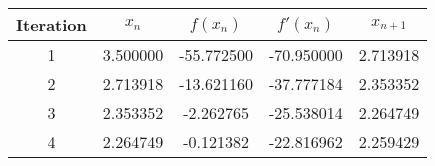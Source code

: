 \begin{tabular}{|c|c|c|c|c|}
\hline
Iteration & $x_n$ & $f(x_n)$ & $f'(x_n)$ & $x_{n+1}$ \\
\hline
1 & 3.500000 & -55.772500 & -70.950000 & 2.713918 \\
\hline
2 & 2.713918 & -13.621160 & -37.777184 & 2.353352 \\
\hline
3 & 2.353352 & -2.262765 & -25.538014 & 2.264749 \\
\hline
4 & 2.264749 & -0.121382 & -22.816962 & 2.259429 \\
\hline
\end{tabular}